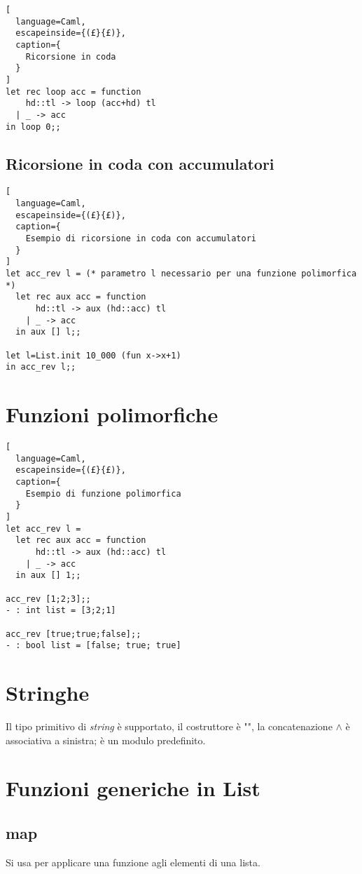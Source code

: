 \begin{lstlisting}[
  language=Caml,
  escapeinside={(£}{£)},
  caption={
    Ricorsione in coda
  }
]
let rec loop acc = function
    hd::tl -> loop (acc+hd) tl
  | _ -> acc
in loop 0;;
\end{lstlisting}


\subsection{Ricorsione in coda con accumulatori}
\begin{lstlisting}[
  language=Caml,
  escapeinside={(£}{£)},
  caption={
    Esempio di ricorsione in coda con accumulatori
  }
]
let acc_rev l = (* parametro l necessario per una funzione polimorfica *)
  let rec aux acc = function
      hd::tl -> aux (hd::acc) tl
    | _ -> acc
  in aux [] l;;

let l=List.init 10_000 (fun x->x+1)
in acc_rev l;;
\end{lstlisting}

\section{Funzioni polimorfiche}
\begin{lstlisting}[
  language=Caml,
  escapeinside={(£}{£)},
  caption={
    Esempio di funzione polimorfica
  }
]
let acc_rev l =
  let rec aux acc = function
      hd::tl -> aux (hd::acc) tl
    | _ -> acc
  in aux [] 1;;

acc_rev [1;2;3];;
- : int list = [3;2;1]

acc_rev [true;true;false];;
- : bool list = [false; true; true]
\end{lstlisting}

\section{Stringhe}
Il tipo primitivo di \emph{string} è supportato, il costruttore è "", la
concatenazione $\wedge$ è associativa a sinistra; è un modulo predefinito.

\section{Funzioni generiche in List}
\subsection{map}
Si usa per applicare una funzione agli elementi di una lista.

